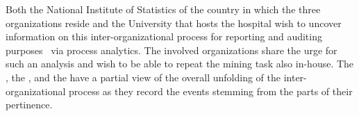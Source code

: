 Both the National Institute of Statistics of the country in which the three organizations reside and the University that hosts the hospital wish to uncover information on this inter-organizational process for reporting and auditing purposes~\citep{Jans.Hosseinpour/IJAIS2019:ActiveLearningProcessMiningForAuditing} via process analytics. The involved organizations share the urge for such an analysis and wish to be able to repeat the mining task also in-house. 
The , the , and the  have a partial view of the overall unfolding of the inter-organizational process as they record the events stemming from the parts of their pertinence. %


